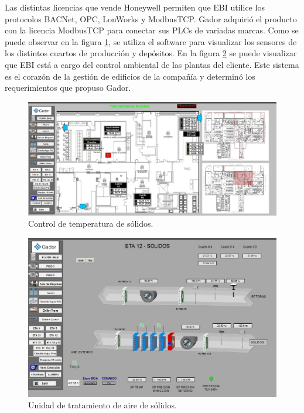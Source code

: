 Las distintas licencias que vende Honeywell permiten que EBI utilice los protocolos BACNet, OPC, LonWorks y ModbusTCP.
Gador adquirió el producto con la licencia ModbusTCP para conectar sus PLCs de variadas marcas.
Como se puede observar en la figura \ref{fig:ch2EBI1}, se utiliza el software para visualizar los sensores de los distintos cuartos de producción y depósitos.
En la figura \ref{fig:ch2EBI2} se puede visualizar que EBI está a cargo del control ambiental de las plantas del cliente.
Este sistema es el corazón de la gestión de edificios de la compañía y determinó los requerimientos que propuso Gador.

\begin{figure}[h]
	\centering
	\includegraphics[width=\textwidth]{./Figures/ch2EBI1.jpg}
	\caption{Control de temperatura de sólidos.}
	\label{fig:ch2EBI1}
\end{figure}

\begin{figure}[h]
	\centering
	\includegraphics[width=\textwidth]{./Figures/ch2EBI2.jpg}
	\caption{Unidad de tratamiento de aire de sólidos.}
	\label{fig:ch2EBI2}
\end{figure}